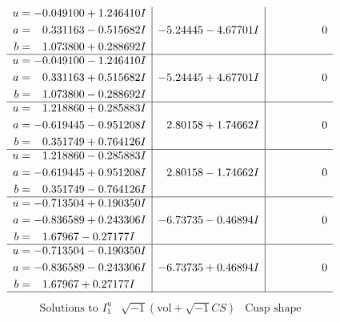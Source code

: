 \documentclass[1p]{elsarticle_modified}
\theoremstyle{definition}
\newcommand{\I}{\sqrt{-1}}
\begin{document}
$$\begin{array}{c|c|c}
\begin{aligned}
u &= -0.049100 + 1.246410 I \\
a &= \phantom{-}0.331163 - 0.515682 I \\
b &= \phantom{-}1.073800 + 0.288692 I\end{aligned}
 & -5.24445 - 4.67701 I & \phantom{-0.000000 } 0 \\ \hline\begin{aligned}
u &= -0.049100 - 1.246410 I \\
a &= \phantom{-}0.331163 + 0.515682 I \\
b &= \phantom{-}1.073800 - 0.288692 I\end{aligned}
 & -5.24445 + 4.67701 I & \phantom{-0.000000 } 0 \\ \hline\begin{aligned}
u &= \phantom{-}1.218860 + 0.285883 I \\
a &= -0.619445 - 0.951208 I \\
b &= \phantom{-}0.351749 + 0.764126 I\end{aligned}
 & \phantom{-}2.80158 + 1.74662 I & \phantom{-0.000000 } 0 \\ \hline\begin{aligned}
u &= \phantom{-}1.218860 - 0.285883 I \\
a &= -0.619445 + 0.951208 I \\
b &= \phantom{-}0.351749 - 0.764126 I\end{aligned}
 & \phantom{-}2.80158 - 1.74662 I & \phantom{-0.000000 } 0 \\ \hline\begin{aligned}
u &= -0.713504 + 0.190350 I \\
a &= -0.836589 + 0.243306 I \\
b &= \phantom{-}1.67967 - 0.27177 I\end{aligned}
 & -6.73735 - 0.46894 I & \phantom{-0.000000 } 0 \\ \hline\begin{aligned}
u &= -0.713504 - 0.190350 I \\
a &= -0.836589 - 0.243306 I \\
b &= \phantom{-}1.67967 + 0.27177 I\end{aligned}
 & -6.73735 + 0.46894 I & \phantom{-0.000000 } 0\\
 \hline 
 \end{array}$$\newpage$$\begin{array}{c|c|c}  
\text{Solutions to }I^u_{1}& \I (\text{vol} + \sqrt{-1}CS) & \text{Cusp shape}\\
 \hline 
\begin{aligned}

\end{aligned}
\end{array}$$
\end{document}
